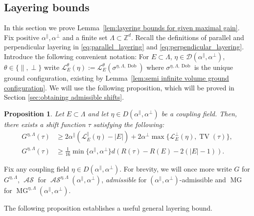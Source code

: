\documentclass[11pt, reqno]{amsart}
\newtheorem{proposition}[theorem]{Proposition}
\newcommand{\Z}{\mathbb{Z}}
\DeclareMathOperator{\Dob}{Dob}
\DeclareMathOperator{\TV}{TV}
\DeclareMathOperator{\MG}{MG}
\DeclareMathOperator{\AS}{\mathcal{AS}}
\numberwithin{equation}{section}
\begin{document}
\subsection{Layering bounds}
\label{sec:layering}
In this section we prove Lemma~\ref{lem:layering bounds for given maximal gain}.
Fix positive $\alpha^{\parallel},\alpha^{\perp}$ and a finite set $\Lambda\subset \Z^{d}$.
Recall the definitions of parallel and perpendicular layering in \eqref{eq:parallel_layering} and \eqref{eq:perpendicular_layering}.
Introduce the following convenient notation: For $E\subset\Lambda$, $\eta \in \mathcal{D}(\alpha^{\parallel},\alpha^{\perp})$, $\theta \in \{ \parallel,\perp \}$ write $\mathcal{L}_{E}^{\theta}(\eta):=\mathcal{L}_{E}^{\theta}(\sigma^{\eta,\Lambda,\Dob})$ where $\sigma^{\eta,\Lambda,\Dob}$ is the unique ground configuration, existing by Lemma~\ref{lem:semi infinite volume ground configuration}.
We will use the following proposition, which will be proved in Section \ref{sec:obtaining admissible shifts}.

\begin{proposition} 
\label{prop:existance_Dob_shift_ground_config}
Let $E\subset \Lambda$ and let $\eta\in D(\alpha^{\parallel},\alpha^{\perp})$ be a coupling field.
Then, there exists a shift function ${\tau}$ satisfying the following:
\begin{align*}
G^{\eta,\Lambda}({\tau})
&\geq    
2\alpha^{\parallel} \left( \mathcal{L}^{\parallel}_E(\eta)-|E|\right)+2\alpha^{\perp}\max\{\mathcal{L}^{\perp}_{E}(\eta),\TV({\tau})\},
\\  
G^{\eta,\Lambda}({\tau})
&\geq \frac{1}{16}\min\{\alpha^{\parallel},\alpha^{\perp}\}d\left(R({\tau})-R(E)-2(|E|-1)\right).
\end{align*}
\end{proposition}

Fix any coupling field $\eta\in D(\alpha^{\parallel},\alpha^{\perp})$.
For brevity, we will once more write 
$G$ for $G^{\eta,\Lambda}$, $\AS$ for $\AS^{\eta,\Lambda}(\alpha^{\parallel},\alpha^{\perp})$, \emph{admissible} for $(\alpha^{\parallel},\alpha^{\perp})$-admissible and $\MG$ for $\MG^{\eta,\Lambda}(\alpha^{\parallel},\alpha^{\perp})$.

The following proposition establishes a useful general layering bound.
\end{document}
